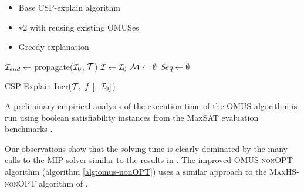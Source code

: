 

\begin{itemize}
    \item Base CSP-explain algorithm
    \item v2 with reusing existing OMUSes
    \item Greedy explanation
\end{itemize}

\begin{algorithm}
  \DontPrintSemicolon
  $\mathcal{I}_{end} \gets$ {propagate($\mathcal{I}_0$, $\mathcal{T}$)} \;
  $\mathcal{I} \gets \mathcal{I}_0$  \;
  $\mathcal{M} \gets \emptyset$ \;
  $Seq \gets \emptyset$  \;
  \caption{CSP-Explain-Incr($\m{T} ,\ f \ [,  \ \m{I}_0 ]$)}
  \label{alg:cspExplain}
\end{algorithm}


A preliminary empirical analysis of the execution time of the OMUS algorithm is run using boolean satisfiability instances from the MaxSAT evaluation benchmarks \cite{ansotegui2017maxsat}.

Our observations show that the solving time is clearly dominated by the many calls to the MIP solver similar to the results in \cite{davies2013postponing}.
The improved \textsc{OMUS-nonOPT} algorithm (algorithm \ref{alg:omus-nonOPT}) uses a similar approach to the \textsc{MaxHS-nonOPT} algorithm of \cite{davies2013postponing}.


